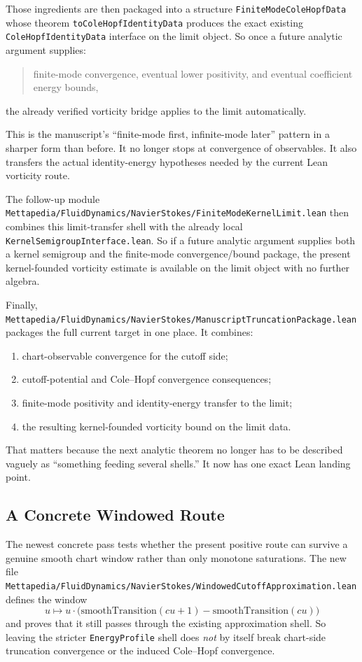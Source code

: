 \documentclass[11pt]{article}
\theoremstyle{remark}
\begin{document}
Those ingredients are then packaged into a structure
\texttt{FiniteModeColeHopfData} whose theorem
\texttt{toColeHopfIdentityData} produces the exact existing
\texttt{ColeHopfIdentityData} interface on the limit object.  So once a future
analytic argument supplies:
\begin{quote}
finite-mode convergence, eventual lower positivity, and eventual coefficient
energy bounds,
\end{quote}
the already verified vorticity bridge applies to the limit automatically.

This is the manuscript's ``finite-mode first, infinite-mode later'' pattern in
a sharper form than before.  It no longer stops at convergence of observables.
It also transfers the actual identity-energy hypotheses needed by the current
Lean vorticity route.

The follow-up module
\texttt{Mettapedia/FluidDynamics/NavierStokes/FiniteModeKernelLimit.lean}
then combines this limit-transfer shell with the already local
\texttt{KernelSemigroupInterface.lean}.  So if a future analytic argument
supplies both a kernel semigroup and the finite-mode convergence/bound package,
the present kernel-founded vorticity estimate is available on the limit object
with no further algebra.

Finally,
\texttt{Mettapedia/FluidDynamics/NavierStokes/ManuscriptTruncationPackage.lean}
packages the full current target in one place.  It combines:
\begin{enumerate}[leftmargin=1.5em]
  \item chart-observable convergence for the cutoff side;
  \item cutoff-potential and Cole--Hopf convergence consequences;
  \item finite-mode positivity and identity-energy transfer to the limit;
  \item the resulting kernel-founded vorticity bound on the limit data.
\end{enumerate}

That matters because the next analytic theorem no longer has to be described
vaguely as ``something feeding several shells.''  It now has one exact Lean
landing point.

\subsection{A Concrete Windowed Route}

The newest concrete pass tests whether the present positive route can survive a
genuine smooth chart window rather than only monotone saturations.  The new
file \texttt{Mettapedia/FluidDynamics/NavierStokes/WindowedCutoffApproximation.lean}
defines the window
\[
  u \mapsto u \cdot
  \bigl(\mathrm{smoothTransition}(cu+1)-\mathrm{smoothTransition}(cu)\bigr)
\]
and proves that it still passes through the existing approximation shell.  So
leaving the stricter \texttt{EnergyProfile} shell does \emph{not} by itself
break chart-side truncation convergence or the induced Cole--Hopf convergence.
\end{document}

